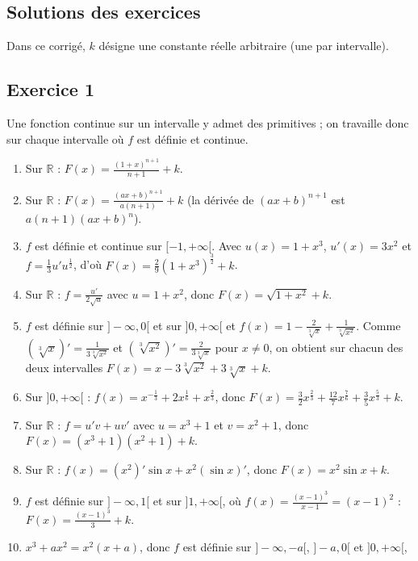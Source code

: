 \begin{corrige}
\section{Solutions des exercices}
Dans ce corrig\'e, $k$ d\'esigne une constante r\'eelle arbitraire (une par intervalle).

\subsection*{Exercice 1}
Une fonction continue sur un intervalle y admet des primitives ; on travaille donc sur chaque intervalle
o\`u $f$ est d\'efinie et continue.
\begin{enumerate}
\item Sur $\mathbb{R}$ : $F(x) = \frac{(1+x)^{n+1}}{n+1} + k$.
\item Sur $\mathbb{R}$ : $F(x) = \frac{(ax+b)^{n+1}}{a(n+1)} + k$ (la d\'eriv\'ee de $(ax+b)^{n+1}$ est $a(n+1)(ax+b)^n$).
\item $f$ est d\'efinie et continue sur $[-1,+\infty[$. Avec $u(x) = 1+x^3$, $u'(x) = 3x^2$ et
      $f = \frac{1}{3} u' u^{\frac{1}{2}}$, d'o\`u $F(x) = \frac{2}{9}\left(1+x^3\right)^{\frac{3}{2}} + k$.
\item Sur $\mathbb{R}$ : $f = \frac{u'}{2\sqrt{u}}$ avec $u = 1+x^2$, donc $F(x) = \sqrt{1+x^2} + k$.
\item $f$ est d\'efinie sur $]-\infty,0[$ et sur $]0,+\infty[$ et
      $f(x) = 1 - \frac{2}{\sqrt[3]{x}} + \frac{1}{\sqrt[3]{x^2}}$.
      Comme $\left(\sqrt[3]{x}\right)' = \frac{1}{3\sqrt[3]{x^2}}$ et $\left(\sqrt[3]{x^2}\right)' = \frac{2}{3\sqrt[3]{x}}$ pour $x\neq 0$,
      on obtient sur chacun des deux intervalles
      $F(x) = x - 3\sqrt[3]{x^2} + 3\sqrt[3]{x} + k$.
\item Sur $]0,+\infty[$ : $f(x) = x^{-\frac{1}{3}} + 2x^{\frac{1}{6}} + x^{\frac{2}{3}}$, donc
      $F(x) = \frac{3}{2} x^{\frac{2}{3}} + \frac{12}{7} x^{\frac{7}{6}} + \frac{3}{5} x^{\frac{5}{3}} + k$.
\item Sur $\mathbb{R}$ : $f = u'v + uv'$ avec $u = x^3+1$ et $v = x^2+1$, donc $F(x) = (x^3+1)(x^2+1) + k$.
\item Sur $\mathbb{R}$ : $f(x) = (x^2)' \sin x + x^2 (\sin x)'$, donc $F(x) = x^2 \sin x + k$.
\item $f$ est d\'efinie sur $]-\infty,1[$ et sur $]1,+\infty[$, o\`u $f(x) = \frac{(x-1)^3}{x-1} = (x-1)^2$ :
      $F(x) = \frac{(x-1)^3}{3} + k$.
\item $x^3 + ax^2 = x^2(x+a)$, donc $f$ est d\'efinie sur $]-\infty,-a[$, $]-a,0[$ et $]0,+\infty[$,

\end{enumerate}
\end{corrige}
